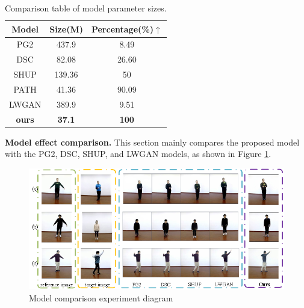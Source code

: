 \begin{table}[]
	\centering
	\caption{Comparison table of model parameter sizes.}
	{\begin{tabular}[c]{ccc}
			\toprule[1pt]
			\textbf{Model} & \textbf{Size(M)} & \textbf{Percentage(\%)}$\uparrow$  \\ 
			\toprule[1pt]
			PG2    & 437.9    & 8.49                           \\
			DSC    & 82.08    & 26.60                          \\
			SHUP   & 139.36   & 50                              \\ 
			PATH   & 41.36    & 90.09                          \\
			LWGAN  & 389.9    & 9.51                             \\ 
			\hline
			\textbf{ours}  & \textbf{37.1}    & \textbf{100}                             \\ 
			\bottomrule[1pt]
		\end{tabular}
		\label{table_1}}
\end{table}
	
\textbf{Model effect comparison.} This section mainly compares the proposed model with the PG2, DSC, SHUP, and LWGAN models, as shown in Figure \ref{image10}.

	\begin{figure}
		\centering
		\includegraphics[scale=1]{image10.png}
		\caption{Model comparison experiment diagram}
		\label{image10}
	\end{figure}

